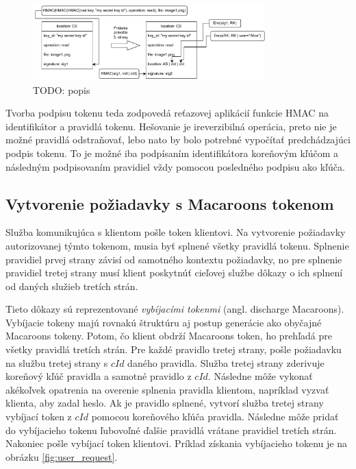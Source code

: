 \begin{figure}
    \centerline{\includegraphics[width=0.8\textwidth]{images/3rd_party_caveat}}
    \caption[Pridanie pravidla tretej strany]{TODO: popis}
    \label{fig:add_caveat}
\end{figure}

Tvorba podpisu tokenu teda zodpovedá reťazovej aplikácií funkcie HMAC na identifikátor a pravidlá tokenu. Hešovanie je ireverzibilná operácia, preto nie je možné pravidlá odstraňovať, lebo nato by bolo potrebné vypočítať predchádzajúci podpis tokenu. To je možné iba podpísaním identifikátora koreňovým kľúčom a následným podpisovaním pravidiel vždy pomocou posledného podpisu ako kľúča.

\subsection{Vytvorenie požiadavky s Macaroons tokenom}

Služba komunikujúca s klientom pošle token klientovi. Na vytvorenie požiadavky autorizovanej týmto tokenom, musia byť splnené všetky pravidlá tokenu. Splnenie pravidiel prvej strany závisí od samotného kontextu požiadavky, no pre splnenie pravidiel tretej strany musí klient poskytnúť cieľovej službe dôkazy o ich splnení od daných služieb tretích strán.

Tieto dôkazy sú reprezentované \textit{vybíjacími tokenmi} (angl. discharge Macaroons). Vybíjacie tokeny majú rovnakú štruktúru aj postup generácie ako obyčajné Macaroons tokeny. Potom, čo klient obdrží Macaroons token, ho prehľadá pre všetky pravidlá tretích strán. Pre každé pravidlo tretej strany, pošle požiadavku na službu tretej strany s $cId$ daného pravidla. Služba tretej strany zderivuje koreňový kľúč pravidla a samotné pravidlo z $cId$. Následne môže vykonať akékoľvek opatrenia na overenie splnenia pravidla klientom, napríklad vyzvať klienta, aby zadal heslo. Ak je pravidlo splnené, vytvorí služba tretej strany vybíjací token z $cId$ pomocou koreňového kľúča pravidla. Následne môže pridať do vybíjacieho tokenu ľubovoľné ďalšie pravidlá vrátane pravidiel tretích strán. Nakoniec pošle vybíjací token klientovi. Príklad získania vybíjacieho tokenu je na obrázku \ref{fig:user_request}.

